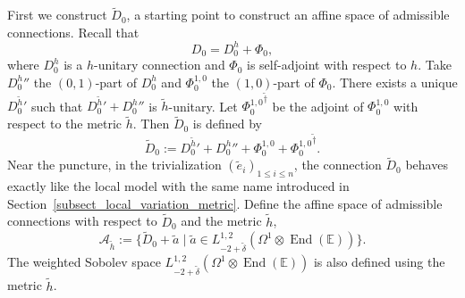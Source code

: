 \documentclass[11pt]{article}
\theoremstyle{definition}
\theoremstyle{plain}
\DeclareMathOperator{\End}{End}
\begin{document}
First we construct $\widetilde{D}_0$, a starting point to construct an affine space of admissible connections. Recall that
\[
D_0 = D_0^h +\Phi_0,
\]
where $D_0^h$ is a $h$-unitary connection and $\Phi_0$ is self-adjoint with respect to $h$. Take ${D^h_0}{}''$ the $(0,1)$-part of $D_0^h$ and $\Phi_0^{1,0}$ the $(1,0)$-part of $\Phi_0$. There exists a unique ${D^{\widetilde{h}}_0}{}'$ such that ${D^{\widetilde{h}}_0}{}'+{D^h_0}{}''$ is $\widetilde{h}$-unitary. Let ${\Phi_0^{1,0}}^{\widetilde{\dagger}}$ be the adjoint of $\Phi_0^{1,0}$ with respect to the metric $\widetilde{h}$. Then $\widetilde{D}_0$ is defined by
\[
\widetilde{D}_0 := {D^{\widetilde{h}}_0}{}'+{D^h_0}{}''+ \Phi_0^{1,0} + {\Phi_0^{1,0}}^{\widetilde{\dagger}}.
\]
Near the puncture, in the trivialization $(\widetilde{e}_i)_{1\le i \le n}$, the connection $\widetilde{D}_0$ behaves exactly like the local model with the same name introduced in Section~\ref{subsect_local_variation_metric}. Define the affine space of admissible connections with respect to $\widetilde{D}_0$ and the metric $\widetilde{h}$,
\[
\mathcal{A}_{\widetilde{h}}:=\lbrace \widetilde{D}_0 + \widetilde{a} \mid \widetilde{a} \in L^{1,2}_{-2+\widetilde{\delta}}(\Omega^1 \otimes \End(\mathbb{E}))\rbrace.
\]
The weighted Sobolev space $L^{1,2}_{-2+\widetilde{\delta}}(\Omega^1\otimes \End(\mathbb{E}))$ is also defined using the metric $\widetilde{h}$.
\end{document}
